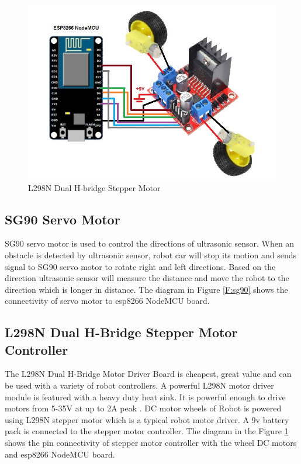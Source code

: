\documentclass[sigconf]{acmart}
\begin{document}
\begin{figure}[htb]
	\includegraphics[width=1.0\columnwidth]{images/L298N_Hbridge.jpg}
	\caption{L298N Dual H-bridge Stepper Motor}\label{F:stepper}
\end{figure}

\subsection{SG90 Servo Motor}
SG90 servo motor is used to control the directions of ultrasonic
sensor. When an obstacle is detected by ultrasonic sensor, robot car
will stop its motion and sends signal to SG90 servo motor to rotate
right and left directions. Based on the direction ultrasonic sensor
will measure the distance and move the robot to the direction which is
longer in distance. The diagram in Figure \ref{F:sg90} shows the 
connectivity of servo motor to esp8266 NodeMCU board.


\subsection{L298N Dual H-Bridge Stepper Motor Controller}
The L298N Dual H-Bridge Motor Driver Board is cheapest, great value 
and can be used with a variety of robot controllers. A powerful L298N 
motor driver module is featured with a heavy duty heat sink. It is 
powerful enough to drive motors from 5-35V at up to 2A peak 
\cite{bananarobotics2013}.
DC motor wheels of Robot is powered using L298N stepper motor which is a 
typical robot motor driver. A 9v battery pack is connected to the stepper 
motor controller. The diagram in the Figure \ref{F:stepper} shows the pin 
connectivity of stepper motor controller with the wheel DC motors and 
esp8266 NodeMCU board.
\end{document}
